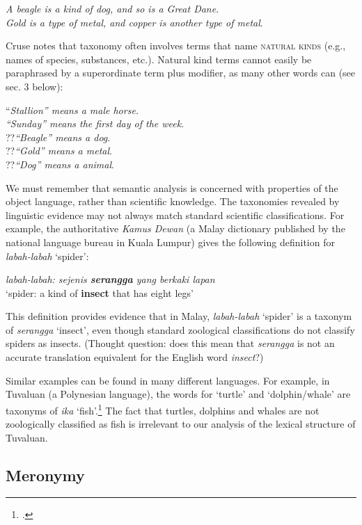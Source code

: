 \ea \label{ex:6.19} \ea \textit{A beagle is a kind of dog, and so is a Great Dane}.\\
\ex \textit{Gold is a type of metal, and copper is another type of metal}.
\z \z


Cruse notes that taxonomy often involves terms that name \textsc{natural kinds} (e.g., names of species, substances, etc.). Natural kind terms cannot easily be paraphrased by a superordinate term plus modifier, as many other words can (see sec. 3 below):


\ea 
\label{ex:6.20}
\ea “\textit{Stallion” means a male horse.}\\
\ex \textit{“Sunday” mean}\textit{s the first day of the week}.\\
\ex ??\textit{“Beagle” means a {\longrule} dog}.\\
\ex ??\textit{“Gold” means a {\longrule} metal}.\\
\ex ??\textit{“Dog” means a {\longrule} animal}.
\z \z


We must remember that semantic analysis is concerned with properties of the object language, rather than scientific knowledge. The taxonomies revealed by linguistic evidence may not always match standard scientific classifications. For example, the authoritative \textit{Kamus Dewan} (a Malay dictionary published by the national language bureau in Kuala Lumpur) gives the following definition for \textit{labah-labah} ‘spider’:


\ea \label{ex:6.21
}\textit{labah-labah: sejenis \textbf{serangga} yang berkaki lapan}\\
‘spider: a kind of \textbf{insect} that has eight legs’
\z


This definition provides evidence that in Malay, \textit{labah-labah} ‘spider’ is a taxonym of \textit{serangga} ‘insect’, even though standard zoological classifications do not classify spiders as insects. (Thought question: does this mean that \textit{serangga} is not an accurate translation equivalent for the English word \textit{insect}?)



Similar examples can be found in many different languages. For example, in Tuvaluan (a Polynesian language), the words for ‘turtle’ and ‘dolphin/whale’ are taxonyms of \textit{ika} ‘fish’.\footnote{\citet[192]{Finegan1999}.} The fact that turtles, dolphins and whales are not zoologically classified as fish is irrelevant to our analysis of the lexical structure of Tuvaluan.


\subsection{Meronymy}\label{sec:6.2.4}

